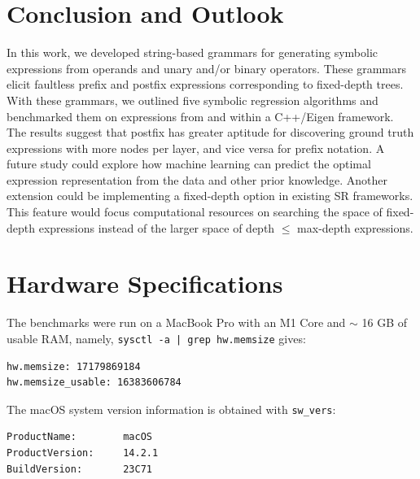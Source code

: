 \documentclass[runningheads]{llncs}
\begin{document}
\section{Conclusion and Outlook}
In this work, we developed string-based grammars for generating symbolic expressions from operands and unary and/or binary operators. These grammars elicit faultless prefix and postfix expressions corresponding to fixed-depth trees. With these grammars, we outlined five symbolic regression algorithms and benchmarked them on expressions from \cite{hemberg2008pre} and \cite{udrescu2020ai} within a C++/Eigen framework. The results suggest that postfix has greater aptitude for discovering ground truth expressions with more nodes per layer, and vice versa for prefix notation. A future study could explore how machine learning can predict the optimal expression representation from the data and other prior knowledge. Another extension could be implementing a fixed-depth option in existing SR frameworks. This feature would focus computational resources on searching the space of fixed-depth expressions instead of the larger space of depth $\leq$ max-depth expressions. 




\appendix
\section{Hardware Specifications}
The benchmarks were run on a MacBook Pro with an M1 Core and $\sim$ 16 GB of usable RAM, namely, \texttt{sysctl -a | grep hw.memsize} gives: 
\begin{verbatim}
hw.memsize: 17179869184
hw.memsize_usable: 16383606784
\end{verbatim}
The macOS system version information is obtained with \texttt{sw\_vers}:
\begin{verbatim}
ProductName:		macOS
ProductVersion:		14.2.1
BuildVersion:		23C71
\end{verbatim}
\end{document}
